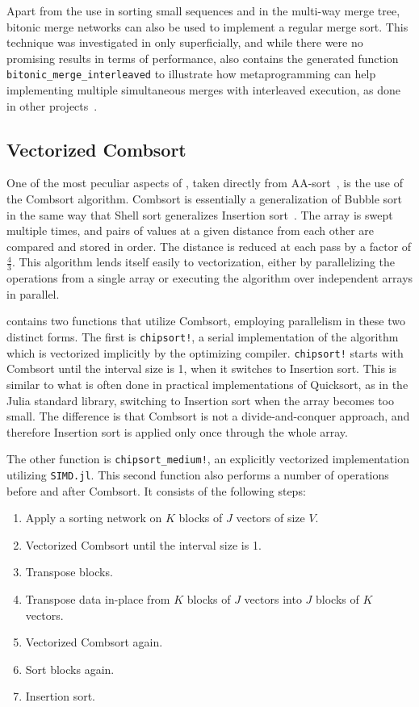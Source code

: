 \documentclass{juliacon}
\begin{document}
Apart from the use in sorting small sequences and in the multi-way merge tree, bitonic merge networks can also be used to implement a regular merge sort. This technique was investigated in \chipsort only superficially, and while there were no promising results in terms of performance, \chipsort also contains the generated function {\tt bitonic\_merge\_interleaved} to illustrate how metaprogramming can help implementing multiple simultaneous merges with interleaved execution, as done in other projects~\cite{DBLP:journals/pvldb/ChhuganiNLMHCBKD08}.

\subsection{Vectorized Combsort}
%
One of the most peculiar aspects of \chipsort, taken directly from AA-sort~\cite{DBLP:conf/IEEEpact/InoueMKN07,DBLP:journals/pvldb/InoueT15}, is the use of the Combsort algorithm. Combsort is essentially a generalization of Bubble sort in the same way that Shell sort generalizes Insertion sort~\cite{INCERPI198737,dobosiewicz1980efficient,Lacey:1991:FES:117187.117218,DBLP:books/lib/Knuth98a,DBLP:books/daglib/0023376}. The array is swept multiple times, and pairs of values at a given distance from each other are compared and stored in order. The distance is reduced at each pass by a factor of $\frac{4}{3}$. This algorithm lends itself easily to vectorization, either by parallelizing the operations from a single array or executing the algorithm over independent arrays in parallel.

\chipsort contains two functions that utilize Combsort, employing parallelism in these two distinct forms. The first is {\tt chipsort!}, a serial implementation of the algorithm which is vectorized implicitly by the optimizing compiler. {\tt chipsort!} starts with Combsort until the interval size is 1, when it switches to Insertion sort. This is similar to what is often done in practical implementations of Quicksort, as in the Julia standard library, switching to Insertion sort when the array becomes too small. The difference is that Combsort is not a divide-and-conquer approach, and therefore Insertion sort is applied only once through the whole array.

The other function is {\tt chipsort\_medium!}, an explicitly vectorized implementation utilizing {\tt SIMD.jl}. This second function also performs a number of operations before and after Combsort. It consists of the following steps:
\begin{enumerate}
\item Apply a sorting network on $K$ blocks of $J$ vectors of size $V$.
\item Vectorized Combsort until the interval size is 1.
\item Transpose blocks.
\item Transpose data in-place from $K$ blocks of $J$ vectors into $J$ blocks of $K$ vectors.
\item Vectorized Combsort again.
\item Sort blocks again.
\item Insertion sort.
\end{enumerate}
\end{document}
